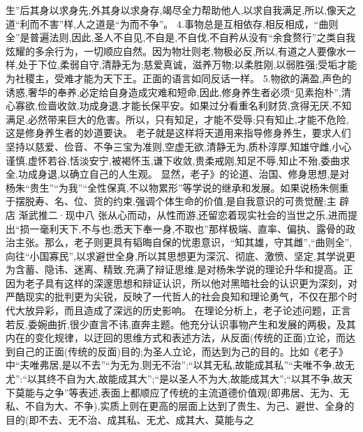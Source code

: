 \documentclass[a4paper,12pt,UTF8,twoside]{ctexbook}
\begin{document}
生”后其身以求身先,外其身以求身存,竭尽全力帮助他人,以求自我满足,所以,像天之道“利而不害”样,人之道是“为而不争”。
4.事物总是互相依存,相反相成，“曲则全”是普遍法则,因此,圣人不自见,不自是,不自伐,不自矜从没有“余食赘行”之类自我炫耀的多余行为，一切顺应自然。因为物壮则老,物极必反,所以,有道之人要像水一样,处于下位,柔弱自守,清静无为;慈爱真诚，滋养万物;以柔胜刚,以弱胜强;受垢才能为社稷主，受难才能为天下王。正面的语言如同反话一样。
5.物欲的满盈,声色的诱惑,奢华的奉养,必定给自身造成灾难和短命,因此,修身养生者必须“见素抱朴”,清心寡欲,俭啬收敛,功成身退,才能长保平安。如果过分看重名利财货,贪得无厌,不知满足,必然带来巨大的危害。所以，只有知足，才能不受辱;只有知止,才能不危险,这是修身养生者的妙道要诀。
老子就是这样将天道用来指导修身养生，要求人们坚持以慈爱、俭音、不争三宝为准则,空虚无欲,清静无为,质朴淳厚,知雄守雌,小心谨慎,虚怀若谷,恬淡安宁,被褐怀玉,谦下收敛,贵柔戒刚,知足不辱,知止不殆,委曲求全,功成身退,以确立自己的人生观。
显然，老子》的论道、治国、修身思想,是对杨朱“贵生”“为我”“全性保真,不以物累形”等学说的继承和发展。如果说杨朱侧重于摆脱寿、名、位、货的约束,强调个体生命的价值,是自我意识的可贵觉醒;主
辟店
渐武推二·现中八
张从心而动，从性而游,还留恋着现实社会的当世之乐,进而提出“损一毫利天下,不与也;悉天下奉一身,不取也”那样极端、直率、偏执、露骨的政治主张。那么，老子则更具有韬晦自保的忧患意识，“知其雄，守其雌”,“曲则全”,向往“小国寡民”,以求避世全身,所以其思想更为深沉、彻底、激愤、坚定,其学说更为含蓄、隐讳、迷离、精致,充满了辩证思维,是对杨朱学说的理论升华和提高。正因为老子具有这样的深邃思想和辩证认识，所以他对黑暗社会的认识更为深刻，对严酷现实的批判更为尖锐，反映了一代哲人的社会良知和理论勇气，不仅在那个时代大放异彩，而且造成了深远的历史影响。
在理论分析上，老子论述问题，正言若反,委婉曲折,很少直言不讳,直奔主题。他充分认识事物产生和发展的两极，及其内在的变化规律，以迂回的思维方式和表述方法，从反面(传统的正面)立论，而达到自己的正面(传统的反面)目的;为圣人立论，而达到为己的目的。比如《老子》中“夫唯弗居,是以不去”“为无为,则无不治”:“以其无私,故能成其私”“夫唯不争,故无尤”:“以其终不自为大,故能成其大”;“是以圣人不为大,故能成其大”;“以其不争,故天下莫能与之争”等表述,表面上都顺应了传统的主流道德价值观(即弗居、无为、无私、不自为大、不争),实质上则在更高的层面上达到了贵生、为己、避世、全身的目的(即不去、无不治、成其私、无尤、成其大、莫能与之
\end{document}
